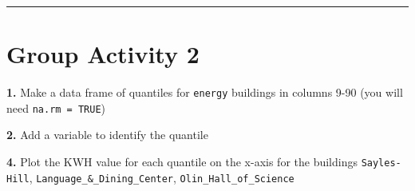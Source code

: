 \documentclass[
]{book}
\begin{document}
\begin{center}\rule{0.5\linewidth}{0.5pt}\end{center}

\hypertarget{group-activity-2-2}{%
\section{Group Activity 2}\label{group-activity-2-2}}

\textbf{1.} Make a data frame of quantiles for \texttt{energy} buildings in columns 9-90 (you will need \texttt{na.rm\ =\ TRUE})

\textbf{2.} Add a variable to identify the quantile

\textbf{4.} Plot the KWH value for each quantile on the x-axis for the buildings \texttt{Sayles-Hill}, \texttt{Language\_\&\_Dining\_Center}, \texttt{Olin\_Hall\_of\_Science}

  
\end{document}
